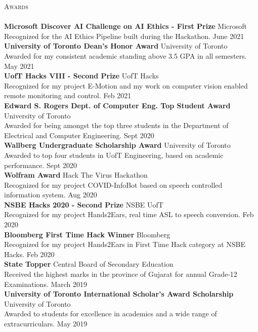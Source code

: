 \documentclass[a4paper]{article}
\newcommand{\lineunder} {
    \vspace*{-8pt} \\
    \hspace*{-18pt} \hrulefill \\
}
\newcommand{\header} [1] {
    {\hspace*{-18pt}\vspace*{6pt} \textsc{#1}}
    \vspace*{-6pt} \lineunder
}
\begin{document}
\header{Awards}
\textbf{Microsoft Discover AI Challenge on AI Ethics - First Prize} \hfill Microsoft\\
Recognized for the AI Ethics Pipeline built during the Hackathon. \hfill June 2021\\
\vspace*{2mm}
\textbf{University of Toronto Dean’s Honor Award} \hfill University of Toronto\\
Awarded for my consistent academic standing above 3.5 GPA in all semesters. \hfill May 2021\\
\vspace*{2mm}
\textbf{UofT Hacks VIII - Second Prize} \hfill UofT Hacks\\
Recognized for my project E-Motion and my work on computer vision enabled remote monitoring and
control. \hfill Feb 2021\\
\vspace*{2mm}
\textbf{Edward S. Rogers Dept. of Computer Eng. Top Student Award} \hfill University of Toronto\\
Awarded for being amongst the top three students in the Department of Electrical and Computer
Engineering. \hfill Sept 2020\\
\vspace*{2mm}
\textbf{Wallberg Undergraduate Scholarship Award} \hfill University of Toronto\\
Awarded to top four students in UofT Engineering, based on academic
performance. \hfill Sept 2020\\
\vspace*{2mm}
\textbf{Wolfram Award} \hfill Hack The Virus Hackathon\\
Recognized for my project COVID-InfoBot based on speech controlled information system. \hfill Aug 2020\\
\vspace*{2mm}
\textbf{NSBE Hacks 2020 - Second Prize} \hfill NSBE UofT\\
Recognized for my project Hands2Ears, real time ASL to speech conversion. \hfill Feb 2020\\
\vspace*{2mm}
\textbf{Bloomberg First Time Hack Winner} \hfill Bloomberg\\
Recognized for my project Hands2Ears in \textquotedbl{}First Time Hack\textquotedbl{} category at NSBE Hacks. \hfill Feb 2020\\
\vspace*{2mm}
\textbf{State Topper} \hfill Central Board of Secondary Education\\
Received the highest marks in the province of Gujarat for annual Grade-12 Examinations. \hfill March 2019\\
\vspace*{2mm}
\textbf{University of Toronto International Scholar’s Award Scholarship} \hfill University of Toronto\\
Awarded to students for excellence in academics and a wide range of extracurriculars. \hfill May 2019\\
\end{document}
